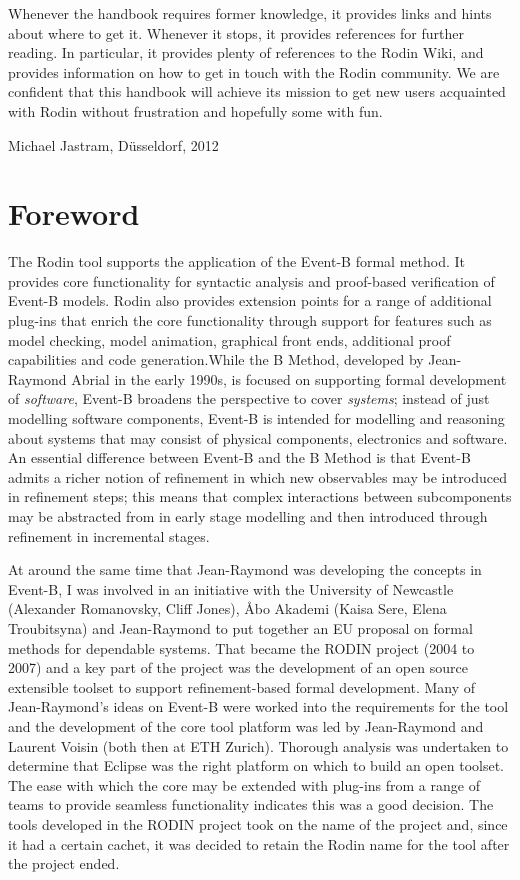 \documentclass[twoside,10pt]{book}
\begin{document}
Whenever the handbook requires former knowledge, it provides links and hints about where to get it.  Whenever it stops, it provides references for further reading.  In particular, it provides plenty of references to the Rodin Wiki, and provides information on how to get in touch with the Rodin community.  We are confident that this handbook will achieve its mission to get new users acquainted with Rodin without frustration and hopefully some with fun.

\begin{flushright}
  Michael Jastram, Düsseldorf, 2012
\end{flushright}

\chapter*{Foreword}
\label{foreword}

The Rodin tool supports the application of the Event-B formal method.  It provides core functionality for syntactic analysis and proof-based verification of Event-B models. Rodin also provides extension points for a range of additional plug-ins that enrich the core functionality through support for features such as model checking, model animation, graphical front ends, additional proof capabilities and code generation.While the B Method, developed by Jean-Raymond Abrial in the early 1990s, is focused on supporting formal development of \textit{software}, Event-B broadens the perspective to cover \textit{systems}; instead of just modelling software components, Event-B is intended for modelling and reasoning about systems that may consist of physical components, electronics and software.  An essential difference between Event-B and the B Method is that Event-B admits a richer notion of refinement in which new observables may be introduced in refinement steps; this means that complex interactions between subcomponents may be abstracted from in early stage modelling and then introduced through refinement in incremental stages.  

At around the same time that Jean-Raymond was developing the concepts in Event-B, I was involved in an initiative with the University of Newcastle (Alexander Romanovsky, Cliff Jones), {\AA}bo Akademi  (Kaisa Sere, Elena Troubitsyna) and Jean-Raymond to put together an EU proposal on formal methods for dependable systems.  That became the RODIN project (2004 to 2007) and a key part of the project was the development of an open source extensible toolset to support refinement-based formal development.  Many of Jean-Raymond’s ideas on Event-B were worked into the requirements for the tool and the development of the core tool platform was led by Jean-Raymond and Laurent Voisin (both then at ETH Zurich). Thorough analysis was undertaken to determine that Eclipse was the right platform on which to build an open toolset.  The ease with which the core may be extended with plug-ins from a range of teams to provide seamless functionality indicates this was a good decision. The tools developed in the RODIN project took on the name of the project and, since it had a certain cachet, it was decided to retain the Rodin name for the tool after the project ended.
\end{document}
